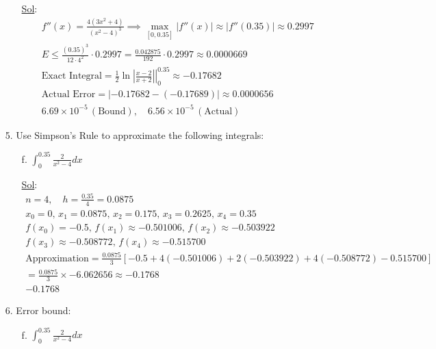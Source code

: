 \begin{enumerate}
\begin{enumerate}
    \underline{Sol}:\\

\[
    \begin{array}{l}
       f''(x) = \frac{4(3x^2 + 4)}{(x^2 - 4)^3} \implies \max_{[0,0.35]} |f''(x)| \approx |f''(0.35)| \approx 0.2997 \\
       E \leq \frac{(0.35)^3}{12 \cdot 4^2} \cdot 0.2997 = \frac{0.042875}{192} \cdot 0.2997 \approx 0.0000669 \\
       \text{Exact Integral} = \left. \frac{1}{2} \ln\left|\frac{x - 2}{x + 2}\right| \right|_{0}^{0.35} \approx -0.17682 \\
       \text{Actual Error} = | -0.17682 - (-0.17689) | \approx 0.0000656 \\
       \boxed{6.69 \times 10^{-5}} \, (\text{Bound}), \quad \boxed{6.56 \times 10^{-5}} \, (\text{Actual})
    \end{array}
\]
  \end{enumerate}


  \item[5.] Use Simpson's Rule to approximate the following integrals:
  
  \begin{enumerate}
    \item[f.] \(\int_{0}^{0.35} \frac{2}{x^2 - 4} dx\)
    

    \underline{Sol}:\\

\[
    \begin{array}{l}
       n = 4, \quad h = \frac{0.35}{4} = 0.0875 \\
       x_0 = 0, \, x_1 = 0.0875, \, x_2 = 0.175, \, x_3 = 0.2625, \, x_4 = 0.35 \\
       f(x_0) = -0.5, \, f(x_1) \approx -0.501006, \, f(x_2) \approx -0.503922 \\
       f(x_3) \approx -0.508772, \, f(x_4) \approx -0.515700 \\
       \text{Approximation} = \frac{0.0875}{3} \left[ -0.5 + 4(-0.501006) + 2(-0.503922) + 4(-0.508772) - 0.515700 \right] \\
       = \frac{0.0875}{3} \times -6.062656 \approx -0.1768 \\
       \boxed{-0.1768}
    \end{array}
\]

  \end{enumerate}

  \item[6.] Error bound:
  
  \begin{enumerate}
    \item[f.] \(\int_{0}^{0.35} \frac{2}{x^2 - 4} dx\)
    

\end{enumerate}
\end{enumerate}
